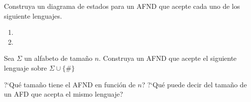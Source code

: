 \documentclass[fcfm]{fcfmcourse}
\begin{document}
\begin{problems}
\problem Construya un diagrama de estados para un AFND que acepte cada uno de los siguiente lenguajes.

\begin{enumerate}
\item {}
\item {}
\end{enumerate}

\problem Sea $\Sigma$ un alfabeto de tamaño $n$. Construya un AFND que acepte el siguiente lenguaje sobre $\Sigma\cup \{\#\}$

\begin{center}
\end{center}

?`Qué tamaño tiene el AFND en función de $n$? ?`Qué puede decir del tamaño de un AFD que acepta el mismo lenguaje?

\end{problems}
\end{document}
